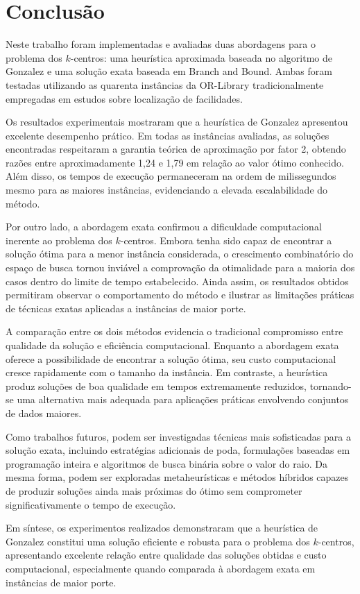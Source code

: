 \documentclass[12pt]{article}
\begin{document}
\section{Conclusão}

Neste trabalho foram implementadas e avaliadas duas abordagens para o problema dos $k$-centros: uma heurística aproximada baseada no algoritmo de Gonzalez e uma solução exata baseada em Branch and Bound. Ambas foram testadas utilizando as quarenta instâncias da OR-Library tradicionalmente empregadas em estudos sobre localização de facilidades.

Os resultados experimentais mostraram que a heurística de Gonzalez apresentou excelente desempenho prático. Em todas as instâncias avaliadas, as soluções encontradas respeitaram a garantia teórica de aproximação por fator 2, obtendo razões entre aproximadamente 1,24 e 1,79 em relação ao valor ótimo conhecido. Além disso, os tempos de execução permaneceram na ordem de milissegundos mesmo para as maiores instâncias, evidenciando a elevada escalabilidade do método.

Por outro lado, a abordagem exata confirmou a dificuldade computacional inerente ao problema dos $k$-centros. Embora tenha sido capaz de encontrar a solução ótima para a menor instância considerada, o crescimento combinatório do espaço de busca tornou inviável a comprovação da otimalidade para a maioria dos casos dentro do limite de tempo estabelecido. Ainda assim, os resultados obtidos permitiram observar o comportamento do método e ilustrar as limitações práticas de técnicas exatas aplicadas a instâncias de maior porte.

A comparação entre os dois métodos evidencia o tradicional compromisso entre qualidade da solução e eficiência computacional. Enquanto a abordagem exata oferece a possibilidade de encontrar a solução ótima, seu custo computacional cresce rapidamente com o tamanho da instância. Em contraste, a heurística produz soluções de boa qualidade em tempos extremamente reduzidos, tornando-se uma alternativa mais adequada para aplicações práticas envolvendo conjuntos de dados maiores.

Como trabalhos futuros, podem ser investigadas técnicas mais sofisticadas para a solução exata, incluindo estratégias adicionais de poda, formulações baseadas em programação inteira e algoritmos de busca binária sobre o valor do raio. Da mesma forma, podem ser exploradas metaheurísticas e métodos híbridos capazes de produzir soluções ainda mais próximas do ótimo sem comprometer significativamente o tempo de execução.

Em síntese, os experimentos realizados demonstraram que a heurística de Gonzalez constitui uma solução eficiente e robusta para o problema dos $k$-centros, apresentando excelente relação entre qualidade das soluções obtidas e custo computacional, especialmente quando comparada à abordagem exata em instâncias de maior porte.




\end{document}
